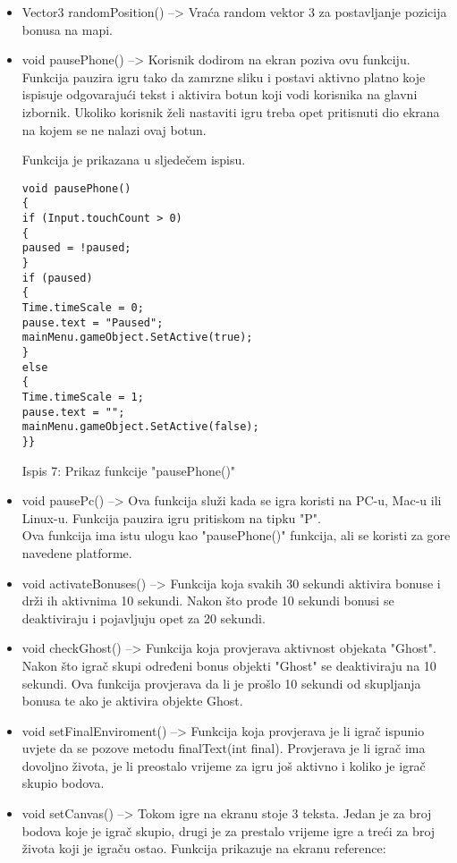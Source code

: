 \begin{itemize}
\item Vector3 randomPosition() --> Vraća random vektor 3 za postavljanje pozicija bonusa na mapi.

\item void pausePhone() --> Korisnik dodirom na ekran poziva ovu funkciju. Funkcija pauzira igru tako da zamrzne sliku i postavi aktivno platno koje ispisuje odgovarajući tekst i aktivira botun koji vodi korisnika na glavni izbornik. Ukoliko korisnik želi nastaviti igru treba opet pritisnuti dio ekrana na kojem se ne nalazi ovaj botun. 

 Funkcija je prikazana u sljedečem ispisu.

\begin{verbatim}
void pausePhone()
{
if (Input.touchCount > 0)
{
paused = !paused;
}
if (paused)
{
Time.timeScale = 0;
pause.text = "Paused";
mainMenu.gameObject.SetActive(true);
}
else
{
Time.timeScale = 1;
pause.text = "";
mainMenu.gameObject.SetActive(false);
}}
\end{verbatim}
\begin{center}
	
	Ispis 7: Prikaz funkcije "pausePhone()"
\end{center}

\item void pausePc() --> Ova funkcija služi kada se igra koristi na PC-u, Mac-u ili Linux-u. Funkcija pauzira igru pritiskom na tipku "P". \\Ova funkcija ima istu ulogu kao "pausePhone()" funkcija, ali se koristi za gore navedene platforme.
\item void activateBonuses() --> Funkcija koja svakih 30 sekundi aktivira bonuse i drži ih aktivnima 10 sekundi. Nakon što prođe 10 sekundi bonusi se deaktiviraju i pojavljuju opet za 20 sekundi.

\item void checkGhost() --> Funkcija koja provjerava aktivnost objekata "Ghost". Nakon što igrač skupi određeni bonus objekti "Ghost" se deaktiviraju na 10 sekundi. Ova funkcija provjerava da li je prošlo 10 sekundi od skupljanja bonusa te ako je aktivira objekte Ghost.

\item void setFinalEnviroment() --> Funkcija koja provjerava je li igrač ispunio uvjete da se pozove metodu finalText(int final). Provjerava je li igrač ima dovoljno života, je li preostalo vrijeme za igru još aktivno i koliko je igrač skupio bodova.
 
\item void setCanvas() --> Tokom igre na ekranu stoje 3 teksta. Jedan je za broj bodova koje je igrač skupio, drugi je za prestalo vrijeme igre a treći za broj života koji  je igraču ostao. Funkcija prikazuje na ekranu reference:


\end{itemize}
